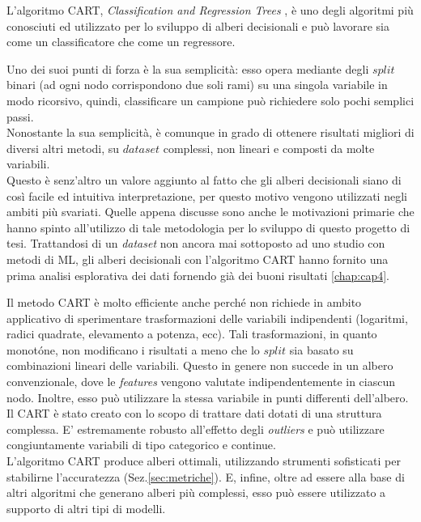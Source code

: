 L'algoritmo CART, \textit{Classification and Regression Trees} \cite{brei:book}, è uno degli algoritmi più conosciuti ed utilizzato per lo sviluppo di alberi decisionali e può lavorare sia come un classificatore che come un regressore.

Uno dei suoi punti di forza è la sua semplicità: esso opera mediante degli $split$ binari (ad ogni nodo corrispondono due soli rami) su una singola variabile in modo ricorsivo, quindi, classificare un campione può richiedere solo pochi semplici passi.\\
Nonostante la sua semplicità, è comunque in grado di ottenere risultati migliori di diversi altri metodi, su $dataset$ complessi, non lineari e composti da molte variabili.\\
Questo è senz'altro un valore aggiunto al fatto che gli alberi decisionali siano di così facile ed intuitiva interpretazione, per questo motivo vengono utilizzati negli ambiti più svariati. Quelle appena discusse sono anche le motivazioni primarie che hanno spinto all'utilizzo di tale metodologia per lo sviluppo di questo progetto di tesi. Trattandosi di un \textit{dataset} non ancora mai sottoposto ad uno studio con metodi di ML, gli alberi decisionali con l'algoritmo CART hanno fornito una prima analisi esplorativa dei dati fornendo già dei buoni risultati \ref{chap:cap4}.

Il metodo CART è molto efficiente anche perché non richiede in ambito applicativo di sperimentare trasformazioni delle variabili indipendenti (logaritmi, radici
quadrate, elevamento a potenza, ecc). Tali trasformazioni, in quanto monotóne, non modificano i risultati a meno che lo $split$ sia basato su combinazioni lineari delle variabili. Questo in genere non succede in un albero convenzionale, dove le \textit{features} vengono valutate indipendentemente in ciascun nodo. Inoltre, esso può utilizzare la stessa variabile in punti differenti dell’albero.\\ 
Il CART è stato creato con lo scopo di trattare dati dotati di una struttura complessa. E' estremamente robusto all’effetto degli \textit{outliers} e può utilizzare congiuntamente variabili di tipo categorico e continue.\\
L'algoritmo CART produce alberi ottimali, utilizzando strumenti sofisticati per stabilirne l'accuratezza (Sez.\ref{sec:metriche}). E, infine, oltre ad essere alla base di altri algoritmi che generano alberi più complessi, esso può essere utilizzato a supporto di altri tipi di modelli.

